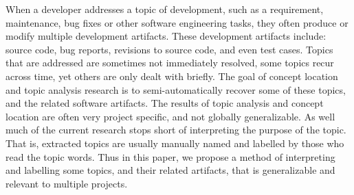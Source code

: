 \documentclass[]{sig-alternate}
\begin{document}
When a developer addresses a topic of development, such as a requirement, maintenance, bug fixes or other software engineering tasks, they often produce or modify multiple development artifacts.
%
These development artifacts include: source code, bug reports, revisions to source code, and even test cases. 
%
Topics that are addressed are sometimes not immediately resolved, some topics recur across time, yet others are only dealt with briefly.
%
The goal of concept location and topic analysis research is to semi-automatically recover some of these topics, and the related software artifacts.
The results of topic analysis and concept location are often very project specific, and not globally generalizable.
As well much of the current research stops short of interpreting the purpose of the topic. That is, extracted topics are usually manually named and labelled by those who read the topic words.
% 
Thus in this paper, we propose a method of interpreting and labelling some topics, and their related artifacts, that is generalizable and relevant to multiple projects.



\end{document}
